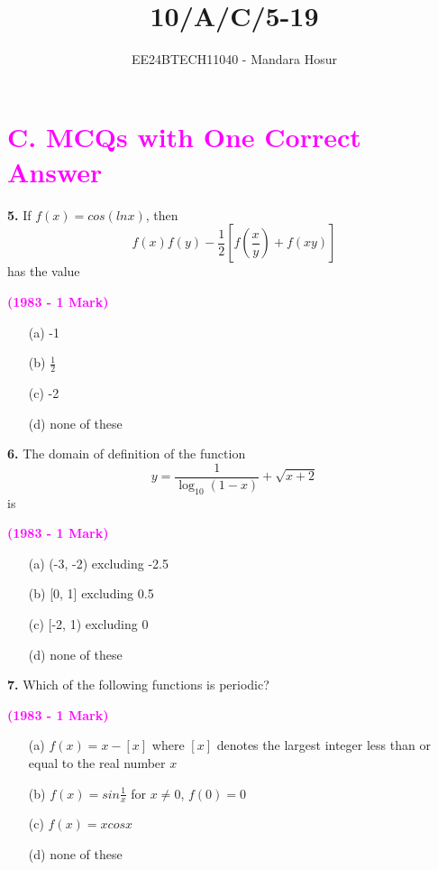 \documentclass[journal,12pt,twocolumn]{IEEEtran}
\theoremstyle{remark}
\begin{document}

\vspace{3cm}

\title{10/A/C/5-19}
\author{EE24BTECH11040 - Mandara Hosur}
\maketitle
\newpage
\bigskip

\renewcommand{\thefigure}{\theenumi}
\renewcommand{\thetable}{\theenumi}

\section*{\textbf{\textcolor{magenta}{C. MCQs with One Correct Answer}}}

\textbf{5.} If $f(x) = cos(ln x)$, then $$f(x)f(y)-\frac{1}{2} \left[f\left(\frac{x}{y}\right)+f(xy)\right]$$ has the value

\hfill{\textcolor{magenta}{\textbf{(1983 - 1 Mark)}}}

\begin{multicols}{2}
	\begin{enumerate}
		\item[(a)] -1 
		\item[(b)] $\frac{1}{2}$
		\item[(c)] -2 
		\item[(d)] none of these
	\end{enumerate}
\end{multicols}

\textbf{6.} The domain of definition of the function
$$y = \frac{1}{\log_{10}{(1-x)}} + \sqrt{x+2}$$ is

\hfill{\textcolor{magenta}{\textbf{(1983 - 1 Mark)}}}

\begin{multicols}{2}
	\begin{enumerate}
		\item[(a)] (-3, -2) excluding -2.5 
		\item[(b)] [0, 1] excluding 0.5
		\item[(c)] [-2, 1) excluding 0 
		\item[(d)] none of these
	\end{enumerate}
\end{multicols}

\textbf{7.} Which of the following functions is periodic?

\hfill{\textcolor{magenta}{\textbf{(1983 - 1 Mark)}}}

\begin{enumerate}
\item[(a)] $f(x)=x-\left[x\right]$ where $\left[x\right]$ denotes the largest integer less than or equal to the real number $x$
\item[(b)] $f(x)=sin\frac{1}{x}$ for $x\neq0$, $f(0)=0$
\item[(c)] $f(x)=xcosx$
\item[(d)] none of these
\end{enumerate}
\end{document}
